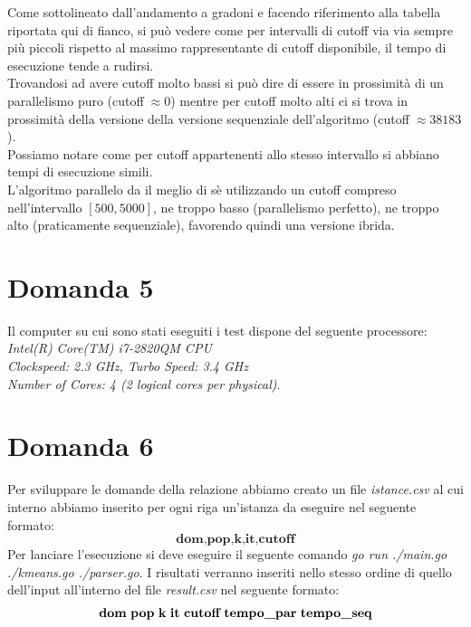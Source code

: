\documentclass{article}
\begin{document}
\noindent Come sottolineato dall'andamento a gradoni e facendo riferimento alla tabella riportata qui di fianco, si può vedere come per intervalli di cutoff via via sempre più piccoli rispetto al massimo rappresentante di cutoff disponibile, il tempo di esecuzione tende a rudirsi.\\ Trovandosi ad avere cutoff molto bassi si può dire di essere in prossimità di un parallelismo puro (cutoff$\;\approx 0$) mentre per cutoff molto alti ci si trova in prossimità della versione della versione sequenziale dell'algoritmo (cutoff$\;\approx 38183$).\\ Possiamo notare come per cutoff appartenenti allo stesso intervallo si abbiano tempi di esecuzione simili.\\
				
\noindent L'algoritmo parallelo da il meglio di sè utilizzando un cutoff compreso nell'intervallo $[500,5000]$, ne troppo basso (parallelismo perfetto), ne troppo alto (praticamente sequenziale), favorendo quindi una versione ibrida.

\section*{Domanda 5}
Il computer su cui sono stati eseguiti i test dispone del seguente processore: \textit{Intel(R) Core(TM) i7-2820QM CPU\\ Clockspeed: 2.3 GHz, Turbo Speed: 3.4 GHz\\ Number of Cores: 4 (2 logical cores per physical)}.

\section*{Domanda 6}
Per sviluppare le domande della relazione abbiamo creato un file \textit{istance.csv} al cui interno abbiamo inserito per ogni riga un'istanza da eseguire nel seguente formato: $$\textbf{dom,pop,k,it,cutoff}$$
Per lanciare l'esecuzione si deve eseguire il seguente comando \textit{go run ./main.go ./kmeans.go ./parser.go}.
I risultati verranno inseriti nello stesso ordine di quello dell'input all'interno del file \textit{result.csv} nel seguente formato: $$\textbf{dom\;pop\;k\;it\;cutoff\;tempo\_par\;tempo\_seq}$$
\end{document}
